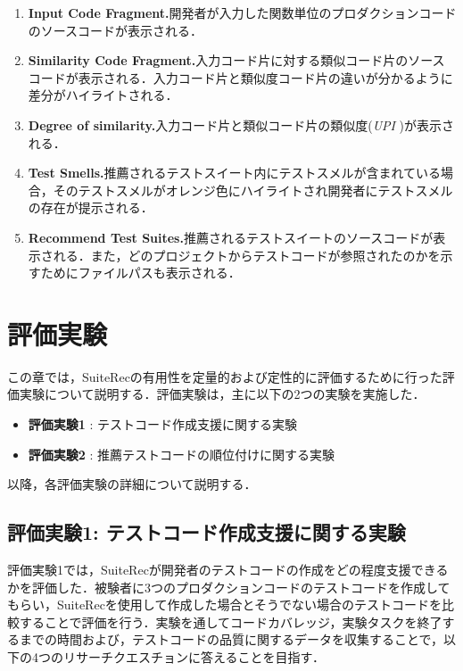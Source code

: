 \documentclass[12pt]{jarticle} %
\begin{document}
\begin{enumerate}
\renewcommand{\labelenumi}{(\arabic{enumi})}
\item{\textbf{Input Code Fragment.}開発者が入力した関数単位のプロダクションコードのソースコードが表示される．}
\item{\textbf{Similarity Code Fragment.}入力コード片に対する類似コード片のソースコードが表示される．入力コード片と類似度コード片の違いが分かるように差分がハイライトされる．}
\item{\textbf{Degree of similarity.}入力コード片と類似コード片の類似度({\it UPI} )が表示される．}
\item{\textbf{Test Smells.}推薦されるテストスイート内にテストスメルが含まれている場合，そのテストスメルがオレンジ色にハイライトされ開発者にテストスメルの存在が提示される．}
\item{\textbf{Recommend Test Suites.}推薦されるテストスイートのソースコードが表示される．また，どのプロジェクトからテストコードが参照されたのかを示すためにファイルパスも表示される．}
\end{enumerate}

\newpage
\section{評価実験}

この章では，{\sf SuiteRec}の有用性を定量的および定性的に評価するために行った評価実験について説明する．評価実験は，主に以下の2つの実験を実施した．

\begin{itemize}
\item \textbf{評価実験1} : テストコード作成支援に関する実験
\item \textbf{評価実験2} : 推薦テストコードの順位付けに関する実験
\end{itemize}

以降，各評価実験の詳細について説明する．

\subsection{評価実験1: テストコード作成支援に関する実験}
評価実験1では，{\sf SuiteRec}が開発者のテストコードの作成をどの程度支援できるかを評価した．被験者に3つのプロダクションコードのテストコードを作成してもらい，{\sf SuiteRec}を使用して作成した場合とそうでない場合のテストコードを比較することで評価を行う．実験を通してコードカバレッジ，実験タスクを終了するまでの時間および，テストコードの品質に関するデータを収集することで，以下の4つのリサーチクエスチョンに答えることを目指す．
\end{document}

